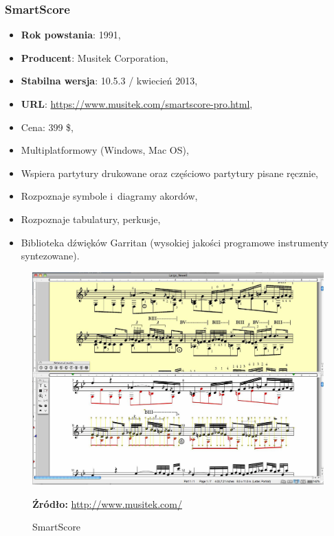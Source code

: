 \documentclass[polish,thesis,12pt]{dcsbook}
\newcommand{\source}[2]{
  	\caption*{\textbf{Źródło:} \href{#1}{{#2}}}
}
\begin{document}
\subsubsection{SmartScore}
\begin{itemize}
  \item \textbf{Rok powstania}: 1991,
  \item \textbf{Producent}: Musitek Corporation,
  \item \textbf{Stabilna wersja}: 10.5.3 / kwiecień 2013,
  \item \textbf{URL}: \url{https://www.musitek.com/smartscore-pro.html},
  \item Cena: 399 \$,
  \item Multiplatformowy (Windows, Mac OS),
  \item Wspiera partytury drukowane oraz częściowo partytury pisane ręcznie,
  \item Rozpoznaje symbole i~diagramy akordów,
  \item Rozpoznaje tabulatury, perkusje,
  \item Biblioteka dźwięków Garritan (wysokiej jakości programowe instrumenty syntezowane).
\end{itemize}

\begin{figure}[H]
  \centering
  \includegraphics[scale=0.3,bb=0 0 1326 968]{img/smartscore.jpg}
  \caption{SmartScore}
  \label{smartscore}
  \source{http://www.musitek.com/smartscore-guitar.html}{http://www.musitek.com/}
\end{figure}
\end{document}
